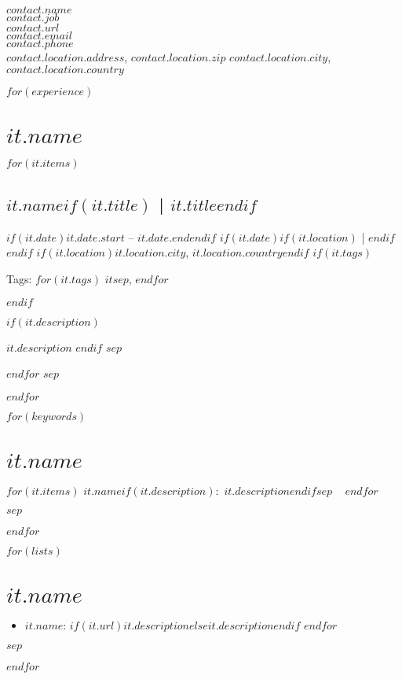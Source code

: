 \documentclass[a4paper,11pt]{article}
\begin{document}
\noindent
{\LARGE\scshape $contact.name$}\\
$contact.job$ \\
\href{$contact.url$}{$contact.url$} \\
\href{mailto:$contact.email$}{$contact.email$} \\
$contact.phone$ \\
$contact.location.address$, $contact.location.zip$ $contact.location.city$, $contact.location.country$


$for(experience)$
\section*{$it.name$}
$for(it.items)$
\subsection*{\href{$it.url$}{$it.name$}$if(it.title)$ | $it.title$$endif$}
{\footnotesize
$if(it.date)$$it.date.start$ -- $it.date.end$$endif$
$if(it.date)$$if(it.location)$ | $endif$$endif$
$if(it.location)$$it.location.city$, {\scshape $it.location.country$}$endif$
$if(it.tags)$

Tags:
$for(it.tags)$
    \mbox{\bf\sffamily $it$}$sep$,
$endfor$

$endif$
}
$if(it.description)$

$it.description$
$endif$
$sep$

$endfor$
$sep$

$endfor$


$for(keywords)$
\section*{$it.name$}
\begin{sloppypar}
$for(it.items)$
    {\bf\sffamily $it.name$}$if(it.description)$:~$it.description$$endif$$sep$ ~ 
$endfor$

\end{sloppypar}
$sep$

$endfor$


$for(lists)$
\section*{$it.name$}
\begin{itemize}
$for(it.items)$
    \item {\bf\sffamily $it.name$}: $if(it.url)$\href{$it.url$}{$it.description$}$else$$it.description$$endif$
$endfor$
\end{itemize}
$sep$

$endfor$
\end{document}
